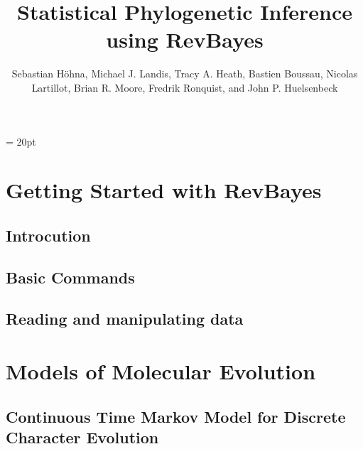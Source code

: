 \documentclass[11pt]{book}
\begin{document}
\renewcommand{\headrulewidth}{0.5pt}
\headsep = 20pt
\lhead{ }


\title{\Huge \textbf{Statistical Phylogenetic Inference using RevBayes} }
\author{
Sebastian H{\"o}hna,
Michael J. Landis,
Tracy A. Heath,
Bastien Boussau,
Nicolas Lartillot,
Brian R. Moore,
Fredrik Ronquist, and
John P. Huelsenbeck
}


\maketitle

\tableofcontents

\def \GlobalResourcePath {./}

\part{Getting Started with RevBayes}

\chapter{Introcution}
\def \ResourcePath {RB_Getting_Started/}


\chapter{Basic Commands}
\def \ResourcePath {RB_Basics_Tutorial/}


\chapter{Reading and manipulating data}
\def \ResourcePath {RB_Data_Tutorial/}




\part{Models of Molecular Evolution}

\chapter{Continuous Time Markov Model for Discrete Character Evolution}
\def \ResourcePath {RB_CTMC_Tutorial/}

\end{document}
